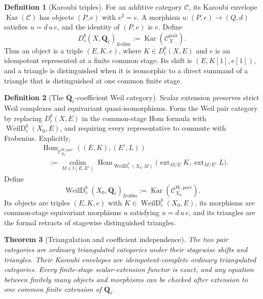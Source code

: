 \documentclass[10pt]{article}
\newtheorem{theorem}{Theorem}[section]
\theoremstyle{definition}
\newtheorem{definition}[theorem]{Definition}
\newcommand{\Ql}{\mathbf Q_\ell}
\newcommand{\Qlb}{\overline{\mathbf Q}_\ell}
\newcommand{\Hom}{\operatorname{Hom}}
\newcommand{\Kar}{\operatorname{Kar}}
\begin{document}
\begin{definition}[Karoubi triples]
For an additive category \(\mathcal C\), its Karoubi envelope
\(\Kar(\mathcal C)\) has objects \((P,e)\) with \(e^2=e\).  A morphism
\(u:(P,e)\to(Q,d)\) satisfies \(u=d\,u\,e\), and the identity of
\((P,e)\) is \(e\).  Define
\[
 D^b_c(X,\Qlb)_{\mathrm{2colim}}
      :=\Kar(\mathcal C_X^{\mathrm{pair}}).
\]
Thus an object is a triple \((E,K,e)\), where \(K\in D^b_c(X,E)\) and
\(e\) is an idempotent represented at a finite common stage.  Its shift is
\((E,K[1],e[1])\), and a triangle is distinguished when it is isomorphic to
a direct summand of a triangle that is distinguished at one common finite
stage.
\end{definition}

\begin{definition}[The \(\Qlb\)-coefficient Weil category]
Scalar extension preserves strict Weil complexes and equivariant
quasi-isomorphisms.  Form the Weil pair category by replacing
\(D^b_c(X,E)\) in the common-stage Hom formula with
\(\operatorname{WeilD}^b_c(X_0,E)\), and requiring every representative to
commute with Frobenius.  Explicitly,
\[
\begin{aligned}
 &\Hom_{\mathcal C_{X_0}^{\mathrm W,pair}}((E,K),(E',L))\\
 &\quad:=
 \operatorname*{colim}_{M\in\mathsf I(E,E')}
 \Hom_{\operatorname{WeilD}^b_c(X_0,M)}
 \bigl(\operatorname{ext}_{M/E}K,
       \operatorname{ext}_{M/E'}L\bigr).
\end{aligned}
\]
Define
\[
 \operatorname{WeilD}^b_c(X_0,\Qlb)_{\mathrm{2colim}}
 :=\Kar(\mathcal C_{X_0}^{\mathrm W,pair}).
\]
Its objects are triples \((E,K,e)\) with
\(K\in\operatorname{WeilD}^b_c(X_0,E)\), its morphisms are
common-stage equivariant morphisms \(u\) satisfying \(u=d\,u\,e\), and its
triangles are the formal retracts of stagewise distinguished triangles.
\end{definition}

\begin{theorem}[Triangulation and coefficient independence]
The two pair categories are ordinary triangulated categories under their
stagewise shifts and triangles.  Their Karoubi envelopes are
idempotent-complete ordinary triangulated categories.  Every finite-stage
scalar-extension functor is exact, and any equation between finitely many
objects and morphisms can be checked after extension to one common finite
extension of \(\Ql\).
\end{theorem}
\end{document}
